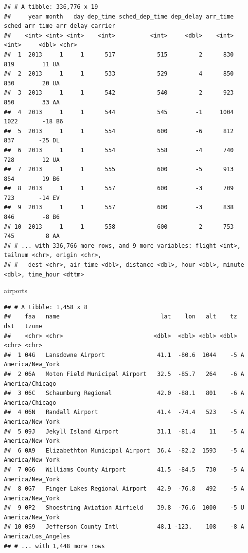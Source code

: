 \documentclass[
]{article}
\newenvironment{Shaded}{\begin{snugshade}}{\end{snugshade}}
\newcommand{\NormalTok}[1]{#1}
\begin{document}
\begin{verbatim}
## # A tibble: 336,776 x 19
##     year month   day dep_time sched_dep_time dep_delay arr_time sched_arr_time arr_delay carrier
##    <int> <int> <int>    <int>          <int>     <dbl>    <int>          <int>     <dbl> <chr>  
##  1  2013     1     1      517            515         2      830            819        11 UA     
##  2  2013     1     1      533            529         4      850            830        20 UA     
##  3  2013     1     1      542            540         2      923            850        33 AA     
##  4  2013     1     1      544            545        -1     1004           1022       -18 B6     
##  5  2013     1     1      554            600        -6      812            837       -25 DL     
##  6  2013     1     1      554            558        -4      740            728        12 UA     
##  7  2013     1     1      555            600        -5      913            854        19 B6     
##  8  2013     1     1      557            600        -3      709            723       -14 EV     
##  9  2013     1     1      557            600        -3      838            846        -8 B6     
## 10  2013     1     1      558            600        -2      753            745         8 AA     
## # ... with 336,766 more rows, and 9 more variables: flight <int>, tailnum <chr>, origin <chr>,
## #   dest <chr>, air_time <dbl>, distance <dbl>, hour <dbl>, minute <dbl>, time_hour <dttm>
\end{verbatim}

\begin{Shaded}
\begin{Highlighting}[]
\NormalTok{airports}
\end{Highlighting}
\end{Shaded}

\begin{verbatim}
## # A tibble: 1,458 x 8
##    faa   name                             lat    lon   alt    tz dst   tzone              
##    <chr> <chr>                          <dbl>  <dbl> <dbl> <dbl> <chr> <chr>              
##  1 04G   Lansdowne Airport               41.1  -80.6  1044    -5 A     America/New_York   
##  2 06A   Moton Field Municipal Airport   32.5  -85.7   264    -6 A     America/Chicago    
##  3 06C   Schaumburg Regional             42.0  -88.1   801    -6 A     America/Chicago    
##  4 06N   Randall Airport                 41.4  -74.4   523    -5 A     America/New_York   
##  5 09J   Jekyll Island Airport           31.1  -81.4    11    -5 A     America/New_York   
##  6 0A9   Elizabethton Municipal Airport  36.4  -82.2  1593    -5 A     America/New_York   
##  7 0G6   Williams County Airport         41.5  -84.5   730    -5 A     America/New_York   
##  8 0G7   Finger Lakes Regional Airport   42.9  -76.8   492    -5 A     America/New_York   
##  9 0P2   Shoestring Aviation Airfield    39.8  -76.6  1000    -5 U     America/New_York   
## 10 0S9   Jefferson County Intl           48.1 -123.    108    -8 A     America/Los_Angeles
## # ... with 1,448 more rows
\end{verbatim}
\end{document}
